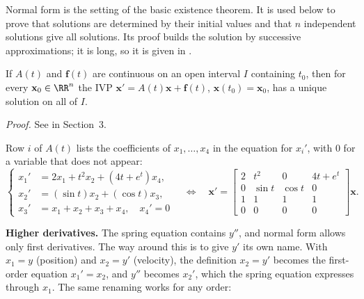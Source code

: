 \documentclass[10pt]{scrartcl}
\newcommand{\vv}[1]{\mathbf{#1}}
\begin{document}
Normal form is the setting of the basic existence theorem. It is used below to prove that solutions are determined by their initial values and that $n$ independent solutions give all solutions. Its proof builds the solution by successive approximations; it is long, so it is given in .

\begin{theorem*}
  If $A(t)$ and $\vv f(t)$ are continuous on an open interval $I$ containing $t_0$, then for every $\vv x_0\in\RR^n$ the IVP $\vv x'=A(t)\vv x+\vv f(t)$, $\vv x(t_0)=\vv x_0$, has a unique solution on all of $I$.
\end{theorem*}
\noindent\emph{Proof.} See  in Section~3.

\begin{example*}
  Row $i$ of $A(t)$ lists the coefficients of $x_1,\dots,x_4$ in the equation for $x_i'$, with $0$ for a variable that does not appear:
  \[
    \left\{
    \begin{aligned}
      x_1'&=2x_1+t^2x_2+(4t+e^t)x_4,\\
      x_2'&=(\sin t)x_2+(\cos t)x_3,\\
      x_3'&=x_1+x_2+x_3+x_4,\quad x_4'=0
    \end{aligned}
    \right.
    \quad\Longleftrightarrow\quad
    \vv x'=
    \begin{bmatrix}
      2&t^2&0&4t+e^t\\0&\sin t&\cos t&0\\1&1&1&1\\0&0&0&0
    \end{bmatrix}\vv x.
  \]
\end{example*}

\medskip\noindent\textbf{Higher derivatives.} The spring equation contains $y''$, and normal form allows only first derivatives. The way around this is to give $y'$ its own name. With $x_1=y$ (position) and $x_2=y'$ (velocity), the definition $x_2=y'$ becomes the first-order equation $x_1'=x_2$, and $y''$ becomes $x_2'$, which the spring equation expresses through $x_1$. The same renaming works for any order:
\end{document}
